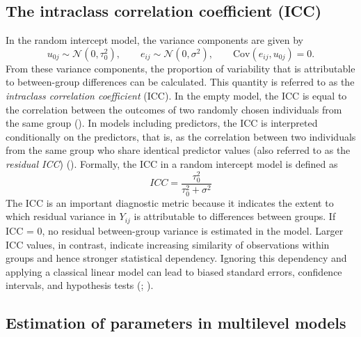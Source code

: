 \documentclass[
  letterpaper,
  11pt,
  english,
  singlespacing,
  headsepline,
  openany]{MastersDoctoralThesis}
\begin{document}
\subsection{The intraclass correlation coefficient
(ICC)}\label{the-intraclass-correlation-coefficient-icc}

In the random intercept model, the variance components are given by \[
u_{0j} \sim \mathcal{N}(0,\tau_0^2),
\qquad
e_{ij} \sim \mathcal{N}(0,\sigma^2),
\qquad
\text{Cov}(e_{ij}, u_{0j}) = 0 .
\] From these variance components, the proportion of variability that is
attributable to between-group differences can be calculated. This
quantity is referred to as the \emph{intraclass correlation coefficient}
(ICC). In the empty model, the ICC is equal to the correlation between
the outcomes of two randomly chosen individuals from the same group
(). In models
including predictors, the ICC is interpreted conditionally on the
predictors, that is, as the correlation between two individuals from the
same group who share identical predictor values (also referred to as the
\emph{residual ICC}) (). Formally, the ICC in a random intercept model is defined as \[
ICC = \frac{\tau_0^2}{\tau_0^2 + \sigma^2}
\] The ICC is an important diagnostic metric because it indicates the
extent to which residual variance in \(Y_{ij}\) is attributable to
differences between groups. If ICC = 0, no residual between-group
variance is estimated in the model. Larger ICC values, in contrast,
indicate increasing similarity of observations within groups and hence
stronger statistical dependency. Ignoring this dependency and applying a
classical linear model can lead to biased standard errors, confidence
intervals, and hypothesis tests (; ).

\subsection{Estimation of parameters in multilevel
models}\label{sec-est}
\end{document}
